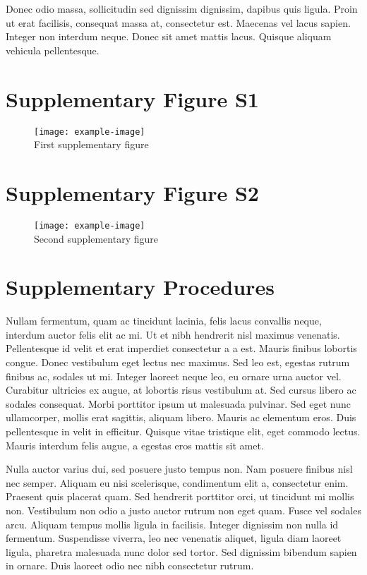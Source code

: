 Donec odio massa, sollicitudin sed dignissim dignissim, dapibus quis ligula. Proin ut erat facilisis, consequat massa at, consectetur est. Maecenas vel lacus sapien. Integer non interdum neque. Donec sit amet mattis lacus. Quisque aliquam vehicula pellentesque.

\section*{Supplementary Figure S1}

\begin{figure}[!ht]
\centering
\texttt{[image: example-image]}
\\ First supplementary figure
\end{figure}

\section*{Supplementary Figure S2}

\begin{figure}[!ht]
\centering
\texttt{[image: example-image]}
\\ Second supplementary figure
\end{figure}

\section*{Supplementary Procedures}

Nullam fermentum, quam ac tincidunt lacinia, felis lacus convallis neque, interdum auctor felis elit ac mi. Ut et nibh hendrerit nisl maximus venenatis. Pellentesque id velit et erat imperdiet consectetur a a est. Mauris finibus lobortis congue. Donec vestibulum eget lectus nec maximus. Sed leo est, egestas rutrum finibus ac, sodales ut mi. Integer laoreet neque leo, eu ornare urna auctor vel. Curabitur ultricies ex augue, at lobortis risus vestibulum at. Sed cursus libero ac sodales consequat. Morbi porttitor ipsum ut malesuada pulvinar. Sed eget nunc ullamcorper, mollis erat sagittis, aliquam libero. Mauris ac elementum eros. Duis pellentesque in velit in efficitur. Quisque vitae tristique elit, eget commodo lectus. Mauris interdum felis augue, a egestas eros mattis sit amet.

Nulla auctor varius dui, sed posuere justo tempus non. Nam posuere finibus nisl nec semper. Aliquam eu nisi scelerisque, condimentum elit a, consectetur enim. Praesent quis placerat quam. Sed hendrerit porttitor orci, ut tincidunt mi mollis non. Vestibulum non odio a justo auctor rutrum non eget quam. Fusce vel sodales arcu. Aliquam tempus mollis ligula in facilisis. Integer dignissim non nulla id fermentum. Suspendisse viverra, leo nec venenatis aliquet, ligula diam laoreet ligula, pharetra malesuada nunc dolor sed tortor. Sed dignissim bibendum sapien in ornare. Duis laoreet odio nec nibh consectetur rutrum.

